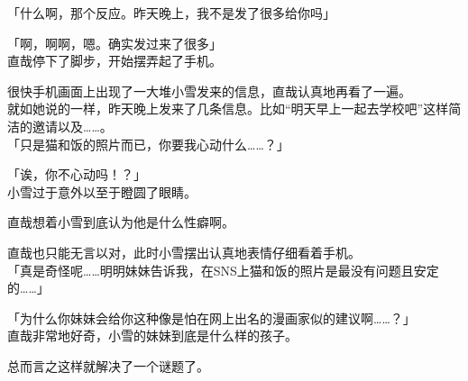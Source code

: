 「什么啊，那个反应。昨天晚上，我不是发了很多给你吗」

「啊，啊啊，嗯。确实发过来了很多」\\

直哉停下了脚步，开始摆弄起了手机。

很快手机画面上出现了一大堆小雪发来的信息，直哉认真地再看了一遍。\\

就如她说的一样，昨天晚上发来了几条信息。比如“明天早上一起去学校吧”这样简洁的邀请以及……。\\

「只是猫和饭的照片而已，你要我心动什么……？」

「诶，你不心动吗！？」\\

小雪过于意外以至于瞪圆了眼睛。

直哉想着小雪到底认为他是什么性癖啊。

直哉也只能无言以对，此时小雪摆出认真地表情仔细看着手机。\\

「真是奇怪呢……明明妹妹告诉我，在SNS上猫和饭的照片是最没有问题且安定的……」

「为什么你妹妹会给你这种像是怕在网上出名的漫画家似的建议啊……？」\\

直哉非常地好奇，小雪的妹妹到底是什么样的孩子。

总而言之这样就解决了一个谜题了。\\

